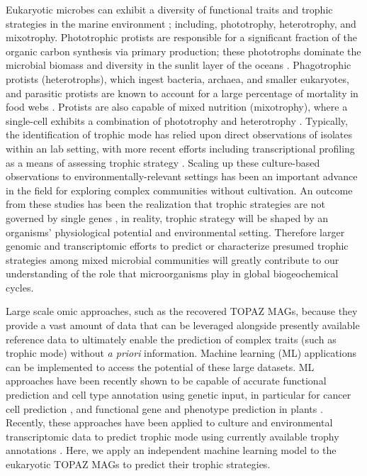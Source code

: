 \documentclass[12pt]{article}
\numberwithin{equation}{section}
\begin{document}
Eukaryotic microbes can exhibit a diversity of functional traits and trophic strategies in the marine environment \citep{Worden2015} \citep{Caron2011Marine}; including, phototrophy, heterotrophy, and mixotrophy. Phototrophic protists are responsible for a significant fraction of the organic carbon synthesis via primary production; these phototrophs dominate the microbial biomass and diversity in the sunlit layer of the oceans \citep{Worden2015,de_Vargas_2015}. Phagotrophic protists (heterotrophs), which ingest bacteria, archaea, and smaller eukaryotes, and parasitic protists are known to account for a large percentage of mortality in food webs \citep{Sherr_2002, Caron2011Marine, Worden2015}. Protists are also capable of mixed nutrition (mixotrophy), where a single-cell exhibits a combination of phototrophy and heterotrophy \citep{Stoecker_2017}. Typically, the identification of trophic mode has relied upon direct observations of isolates within an lab setting, with more recent efforts including transcriptional profiling as a means of assessing trophic strategy \citep{Keeling2014, Liu_2016}.  Scaling up these culture-based observations to environmentally-relevant settings \citep{Alexander2015a, hu2018,Gong_2016} has been an important advance in the field for exploring complex communities without cultivation. An outcome from these studies has been the realization that trophic strategies are not governed by single genes \citep{Labarre_2020}, in reality, trophic strategy will be shaped by an organisms' physiological potential and environmental setting. Therefore larger genomic and transcriptomic efforts to predict or characterize presumed trophic strategies among mixed microbial communities will greatly contribute to our understanding of the role that microorganisms play in global biogeochemical cycles. 

Large scale omic approaches, such as the recovered TOPAZ MAGs, because they provide a vast amount of data that can be leveraged alongside presently available reference data to ultimately enable the prediction of complex traits (such as trophic mode) without \textit{a priori} information.  Machine learning (ML) applications can be implemented to access the potential of these large datasets. ML approaches have been recently shown to be capable of accurate functional prediction and cell type annotation using genetic input, in particular for cancer cell prediction \citep{shipp2002diffuse,bashiri2017improving,tabl2019machine}, and functional gene and phenotype prediction in plants \citep{mahood2020machine}. Recently, these approaches have been applied to culture and environmental transcriptomic data to predict trophic mode using currently available trophy annotations \citep{lambert2021dynamic, burns2018gene,Jimenez_2021}. Here, we apply an independent machine learning model to the eukaryotic TOPAZ MAGs to predict their trophic strategies.
\end{document}
